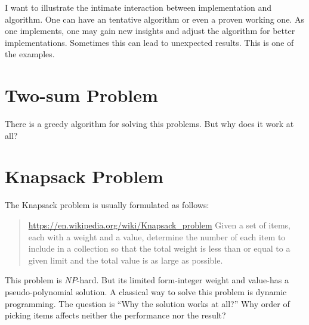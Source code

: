 I want to illustrate the intimate interaction between implementation and algorithm.
One can have an tentative algorithm or even a proven working one.
As one implements, one may gain new insights and adjust the algorithm for better implementations.
Sometimes this can lead to unexpected results.
This is one of the examples.

\section{Two-sum Problem}

There is a greedy algorithm for solving this problems. But why does it work at all?

\section{Knapsack Problem}

The Knapsack problem is usually formulated as follows:
\begin{quote}
    \url{https://en.wikipedia.org/wiki/Knapsack_problem}
    Given a set of items, each with a weight and a value, determine the number of each item to
    include in a collection so that the total weight is less than or equal to a given limit and the
    total value is as large as possible.
\end{quote}

This problem is $NP$-hard.
But its limited form-integer weight and value-has a pseudo-polynomial solution.
A classical way to solve this problem is dynamic programming.
The question is ``Why the solution works at all?''
Why order of picking items affects neither the performance nor the result?
